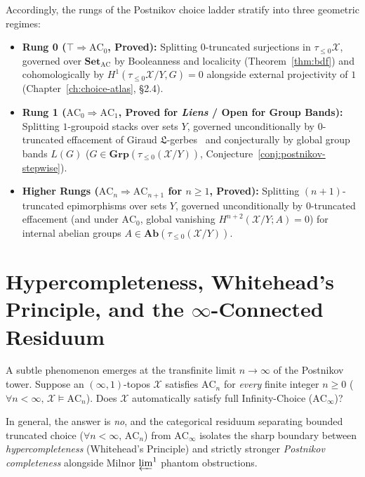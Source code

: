 Accordingly, the rungs of the Postnikov choice ladder stratify into three geometric regimes:

\begin{itemize}

  \item \textbf{Rung 0 ($\top \Rightarrow \mathrm{AC}_0$, Proved):} Splitting $0$-truncated surjections in $\tau_{\le 0}\mathcal{X}$, governed over $\mathbf{Set}_{\mathrm{AC}}$ by Booleanness and localicity (Theorem~\ref{thm:bdf}) and cohomologically by $H^1(\tau_{\le 0}\mathcal{X}/Y, G) = 0$ alongside external projectivity of $1$ (Chapter~\ref{ch:choice-atlas}, \S2.4).

  \item \textbf{Rung 1 ($\mathrm{AC}_0 \Rightarrow \mathrm{AC}_1$, Proved for \emph{Liens} / Open for Group Bands):} Splitting $1$-groupoid stacks over sets $Y$, governed unconditionally by $0$-truncated effacement of Giraud $\mathfrak{L}$-gerbes~\cite[Ch.~IV]{Giraud71} and conjecturally by global group bands $L(G)$ ($G \in \mathbf{Grp}(\tau_{\le 0}(\mathcal{X}/Y))$, Conjecture~\ref{conj:postnikov-stepwise}).

  \item \textbf{Higher Rungs ($\mathrm{AC}_n \Rightarrow \mathrm{AC}_{n+1}$ for $n \ge 1$, Proved):} Splitting $(n+1)$-truncated epimorphisms over sets $Y$, governed unconditionally by $0$-truncated effacement (and under $\mathrm{AC}_0$, global vanishing $H^{n+2}(\mathcal{X}/Y; A) = 0$) for internal abelian groups $A \in \mathbf{Ab}(\tau_{\le 0}(\mathcal{X}/Y))$.

\end{itemize}

\section{Hypercompleteness, Whitehead's Principle, and the $\infty$-Connected Residuum}

A subtle phenomenon emerges at the transfinite limit $n \to \infty$ of the Postnikov tower. Suppose an $(\infty, 1)$-topos $\mathcal{X}$ satisfies $\mathrm{AC}_n$ for \emph{every} finite integer $n \ge 0$ ($\forall n < \infty,\, \mathcal{X} \models \mathrm{AC}_n$). Does $\mathcal{X}$ automatically satisfy full Infinity-Choice ($\mathrm{AC}_\infty$)?

In general, the answer is \emph{no}, and the categorical residuum separating bounded truncated choice ($\forall n < \infty,\, \mathrm{AC}_n$) from $\mathrm{AC}_\infty$ isolates the sharp boundary between \emph{hypercompleteness} (Whitehead's Principle) and strictly stronger \emph{Postnikov completeness} alongside Milnor $\varprojlim^1$ phantom obstructions.


